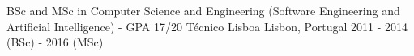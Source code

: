 
\begin{cventries}
  \cventryShort
    {BSc and MSc in Computer Science and Engineering (Software Engineering and Artificial Intelligence) - GPA 17/20}
    {Técnico Lisboa}
    {Lisbon, Portugal}
    {2011 - 2014 (BSc) - 2016 (MSc)}
\end{cventries}
